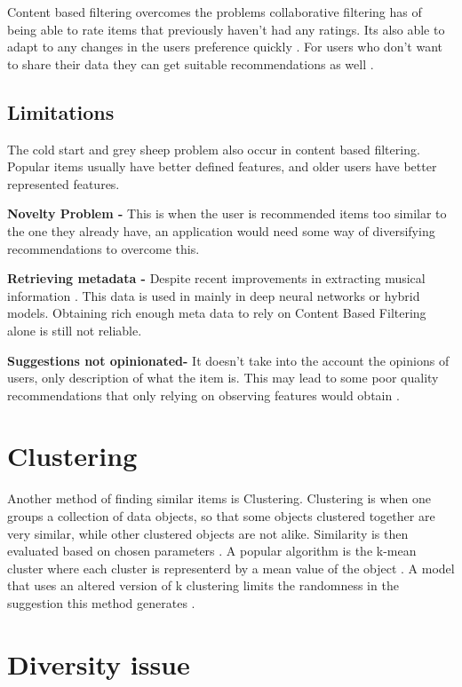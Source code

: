 Content based filtering overcomes the problems collaborative filtering has of being able to rate items that previously haven't had any ratings. Its also able to adapt to any changes in the users preference quickly \citep{isinkaye_recommendation_2015}. For users who don't want to share their data they can get suitable recommendations as well \citep{k_you_2006}.

\subsection{Limitations}
The cold start and grey sheep problem also occur in content based filtering. Popular items usually have better defined features, and older users have better represented features.

\textbf{Novelty Problem - } This is when the user is recommended items too similar to the one they already have, an application would need some way of diversifying recommendations to overcome this.

\textbf{Retrieving metadata - } Despite recent improvements in extracting musical information \citep{vall_feature-combination_2019} \citep{singh_novel_2022}. This data is used in mainly in deep neural networks or hybrid models. Obtaining rich enough meta data to rely on Content Based Filtering alone is still not reliable.

\textbf{Suggestions not opinionated- } It doesn't take into the account the opinions of users, only description of what the item is. This may lead to some poor quality recommendations that only relying on observing features would obtain \citep{celma_recommendation_2010}.  

\section{Clustering}

Another method of finding similar items is Clustering. Clustering is when one  groups a collection of data objects, so that some objects clustered together are very similar, while other clustered objects are not alike. Similarity is then evaluated based on chosen parameters \citep{ferretti_clustering_2018}. A popular algorithm is the k-mean cluster where each cluster is representerd by a mean value of the object \citep{han_data_2006}. A model that uses an altered version of k clustering limits the randomness in the suggestion this method generates \citep{chang_personalized_2017}.


\section{Diversity issue}

